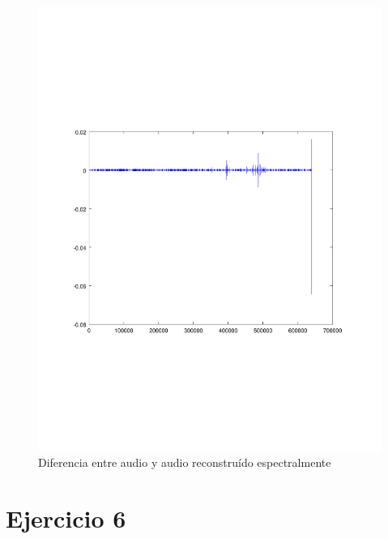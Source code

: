 \documentclass[paper=a4, fontsize=11pt]{scrartcl} %
\numberwithin{equation}{section} %
\numberwithin{figure}{section} %
\numberwithin{table}{section} %
\begin{document}
\begin{figure}[t!]
\includegraphics[width=\textwidth]{../images/difference_reconstruction_5.pdf}
\caption{Diferencia entre audio y audio reconstruído espectralmente}
\label{diff_audio_reconstruido}
\end{figure}


\newpage
\section{Ejercicio 6}
\end{document}
